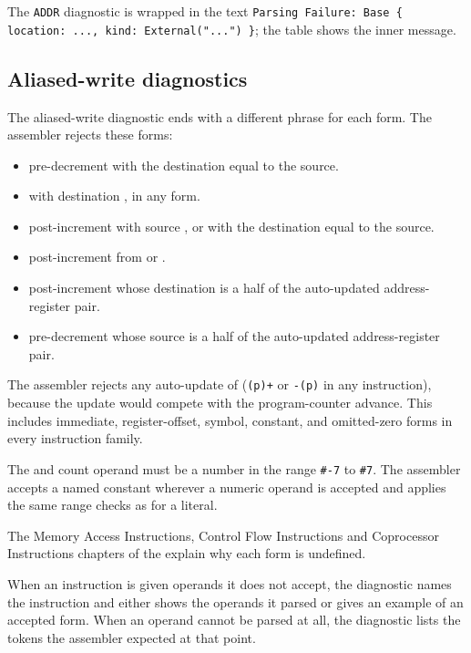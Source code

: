 The \texttt{ADDR} diagnostic is wrapped in the text \texttt{Parsing Failure: Base \{ location: ..., kind:
	External("...") \}}; the table shows the inner message.

\subsection*{Aliased-write diagnostics}

The aliased-write diagnostic ends with a different phrase for each form. The assembler rejects these forms:

\begin{itemize}
	\item {} pre-decrement with the destination equal to the source.
	\item {} with destination , in any form.
	\item {} post-increment with source , or with the destination equal to the source.
	\item {} post-increment from  or .
	\item {} post-increment whose destination is a half of the auto-updated address-register pair.
	\item {} pre-decrement whose source is a half of the auto-updated address-register pair.
\end{itemize}

The assembler rejects any auto-update of  (\texttt{(p)+} or \texttt{-(p)} in any instruction), because the
update would compete with the program-counter advance. This includes immediate, register-offset, symbol, constant, and
omitted-zero forms in every instruction family.

The  and  count operand must be a number in the range \texttt{\#-7} to \texttt{\#7}. The
assembler accepts a named constant wherever a numeric operand is accepted and applies the same range checks as for a
literal.

The Memory Access Instructions, Control Flow Instructions and Coprocessor Instructions chapters of the \archmanual{}
explain why each form is undefined.

When an instruction is given operands it does not accept, the diagnostic names the instruction and either shows the
operands it parsed or gives an example of an accepted form. When an operand cannot be parsed at all, the diagnostic
lists the tokens the assembler expected at that point.

